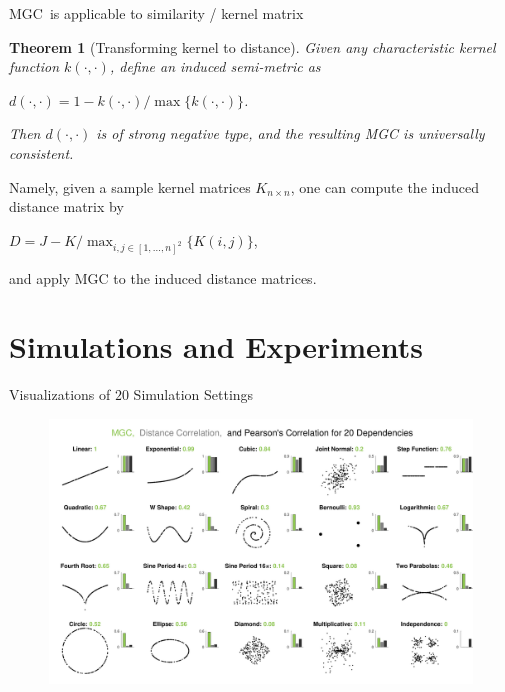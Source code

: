 \documentclass[mathserif,t]{beamer}
\newtheorem{thm}{Theorem}
\newcommand{\Mgc}{MGC}
\newcommand{\mbx}{X}
\newcommand{\mby}{Y}
\begin{document}
\begin{frame}{\Mgc~is applicable to similarity / kernel matrix}
\begin{thm}[Transforming kernel to distance]
Given any characteristic kernel function $k(\cdot,\cdot)$, define an induced semi-metric as 
\begin{center}
$d(\cdot,\cdot)=1-k(\cdot,\cdot) / \max\{k(\cdot,\cdot)\}$.
\end{center}
Then $d(\cdot,\cdot)$ is of strong negative type, and the resulting MGC is universally consistent.
\end{thm}
Namely, given a sample kernel matrices $K_{n \times n}$, one can compute the induced distance matrix by 
\begin{center}
$D=J-K/\max_{i,j \in [1,\ldots,n]^2}\{K(i,j)\}$,
\end{center}
and apply MGC to the induced distance matrices.
\end{frame}

\section{Simulations and Experiments}
\begin{frame}{Visualizations of $20$ Simulation Settings}
\pause
\begin{figure}[ht]
  \centering
  \includegraphics[width=1.0\textwidth]{FigSimVisual2}
	\label{f:dependencies}
\end{figure}
\end{frame}
\end{document}
